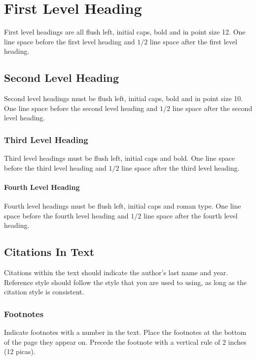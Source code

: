 \documentclass[a4paper]{article}
\begin{document}
\section{First Level Heading}

First level headings are all flush left, initial caps, bold and in point
size 12. One line space before the first level heading and $1/2$ line
space after the first level heading.

\subsection{Second Level Heading}

Second level headings must be flush left, initial caps, bold and in point
size 10. One line space before the second level heading and $1/2$ line
space after the second level heading.

\subsubsection{Third Level Heading}

Third level headings must be flush left, initial caps and bold.
One line space before the third level heading and $1/2$ line
space after the third level heading.

\paragraph{Fourth Level Heading}

Fourth level headings must be flush left, initial caps and roman type.
One line space before the fourth level heading and $1/2$ line
space after the fourth level heading.

\subsection{Citations In Text}

Citations within the text should indicate the author's last name and
year\cite{Knuth-vol3}. Reference style\cite{Comer-btree}
should follow the style that you are used to using, as long as the
citation style is consistent.

\subsubsection{Footnotes}

Indicate footnotes with a number in
the text. Place the footnotes at the bottom of the page they appear on.
Precede the footnote with a vertical rule of 2 inches (12 picas).
\end{document}
